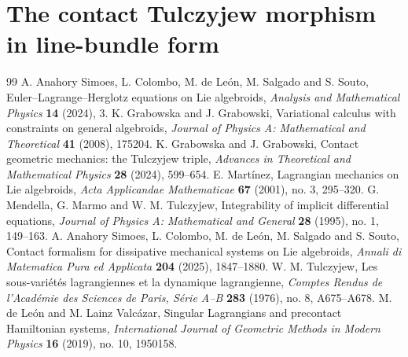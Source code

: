 \documentclass[10pt,a4paper]{amsart}
\newtheorem{remark}[theorem]{Remark}
\begin{document}


\section{The contact Tulczyjew morphism in line-bundle form}
\label{sec:intrinsic}


\begin{thebibliography}{99}
 A. Anahory Simoes, L. Colombo, M. de Le\'on, M. Salgado and S. Souto, Euler--Lagrange--Herglotz equations on Lie algebroids, \textit{Analysis and Mathematical Physics} \textbf{14} (2024), 3.
 K. Grabowska and J. Grabowski, Variational calculus with constraints on general algebroids, \textit{Journal of Physics A: Mathematical and Theoretical} \textbf{41} (2008), 175204.
 K. Grabowska and J. Grabowski, Contact geometric mechanics: the Tulczyjew triple, \textit{Advances in Theoretical and Mathematical Physics} \textbf{28} (2024), 599--654.
 E. Mart\'inez, Lagrangian mechanics on Lie algebroids, \textit{Acta Applicandae Mathematicae} \textbf{67} (2001), no. 3, 295--320.
 G. Mendella, G. Marmo and W. M. Tulczyjew, Integrability of implicit differential equations, \textit{Journal of Physics A: Mathematical and General} \textbf{28} (1995), no. 1, 149--163.
 A. Anahory Simoes, L. Colombo, M. de Le\'on, M. Salgado and S. Souto, Contact formalism for dissipative mechanical systems on Lie algebroids, \textit{Annali di Matematica Pura ed Applicata} \textbf{204} (2025), 1847--1880.
 W. M. Tulczyjew, Les sous-vari\'et\'es lagrangiennes et la dynamique lagrangienne, \textit{Comptes Rendus de l'Acad\'emie des Sciences de Paris, S\'erie A--B} \textbf{283} (1976), no. 8, A675--A678.
 M. de Le\'on and M. Lainz Valc\'azar, Singular Lagrangians and precontact Hamiltonian systems, \textit{International Journal of Geometric Methods in Modern Physics} \textbf{16} (2019), no. 10, 1950158.
\end{thebibliography}
\end{document}
